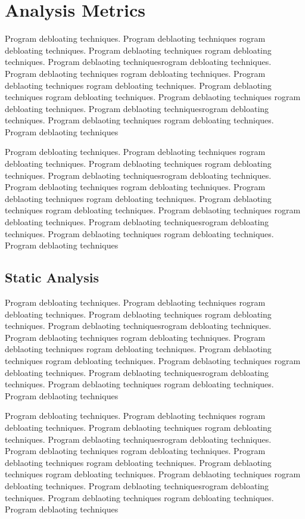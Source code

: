 \documentclass{relatorio}
\begin{document}
\section{Analysis Metrics}%
\label{Tools}

Program debloating techniques. Program deblaoting techniques rogram debloating techniques. Program deblaoting techniques
rogram debloating techniques. Program deblaoting techniquesrogram debloating techniques. Program deblaoting techniques
rogram debloating techniques. Program deblaoting techniques rogram debloating techniques. Program deblaoting techniques
rogram debloating techniques. Program deblaoting techniques 
rogram debloating techniques. Program deblaoting techniquesrogram debloating techniques. Program deblaoting techniques
rogram debloating techniques. Program deblaoting techniques

Program debloating techniques. Program deblaoting techniques rogram debloating techniques. Program deblaoting techniques
rogram debloating techniques. Program deblaoting techniquesrogram debloating techniques. Program deblaoting techniques
rogram debloating techniques. Program deblaoting techniques rogram debloating techniques. Program deblaoting techniques
rogram debloating techniques. Program deblaoting techniques 
rogram debloating techniques. Program deblaoting techniquesrogram debloating techniques. Program deblaoting techniques
rogram debloating techniques. Program deblaoting techniques

\subsection{Static Analysis}%
\label{Tools}

Program debloating techniques. Program deblaoting techniques rogram debloating techniques. Program deblaoting techniques
rogram debloating techniques. Program deblaoting techniquesrogram debloating techniques. Program deblaoting techniques
rogram debloating techniques. Program deblaoting techniques rogram debloating techniques. Program deblaoting techniques
rogram debloating techniques. Program deblaoting techniques 
rogram debloating techniques. Program deblaoting techniquesrogram debloating techniques. Program deblaoting techniques
rogram debloating techniques. Program deblaoting techniques

Program debloating techniques. Program deblaoting techniques rogram debloating techniques. Program deblaoting techniques
rogram debloating techniques. Program deblaoting techniquesrogram debloating techniques. Program deblaoting techniques
rogram debloating techniques. Program deblaoting techniques rogram debloating techniques. Program deblaoting techniques
rogram debloating techniques. Program deblaoting techniques 
rogram debloating techniques. Program deblaoting techniquesrogram debloating techniques. Program deblaoting techniques
rogram debloating techniques. Program deblaoting techniques
\end{document}
